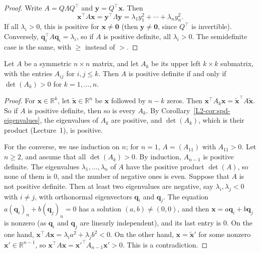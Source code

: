 \begin{proof}
    Write $A = Q\Lambda Q^\top$ and $\mathbf{y} = Q^\top \mathbf{x}$. Then
    \[\mathbf{x}^\top A \mathbf{x} = \mathbf{y}^\top \Lambda \mathbf{y} = \lambda_1 y_1^2 + \cdots + \lambda_n y_n^2.\]
    If all $\lambda_i > 0$, this is positive for $\mathbf{x} \neq \mathbf{0}$ (then $\mathbf{y} \neq \mathbf{0}$, since $Q^\top$ is invertible). Conversely, $\mathbf{q}_i^\top A \mathbf{q}_i = \lambda_i$, so if $A$ is positive definite, all $\lambda_i > 0$. The semidefinite case is the same, with $\geq$ instead of $>$.
\end{proof}

\begin{corollary}\label{L2-cor:sylvester}
    Let $A$ be a symmetric $n \times n$ matrix, and let $A_k$ be its upper left $k \times k$ submatrix, with the entries $A_{ij}$ for $i, j \leq k$. Then $A$ is positive definite if and only if $\det(A_k) > 0$ for $k = 1, \ldots, n$.
\end{corollary}

\begin{proof}
    For $\mathbf{x} \in \mathbb{R}^k$, let $\tilde{\mathbf{x}} \in \mathbb{R}^n$ be $\mathbf{x}$ followed by $n - k$ zeros. Then $\mathbf{x}^\top A_k \mathbf{x} = \tilde{\mathbf{x}}^\top A\tilde{\mathbf{x}}$. So if $A$ is positive definite, then so is every $A_k$. By Corollary~\ref{L2-cor:spd-eigenvalues}, the eigenvalues of $A_k$ are positive, and $\det(A_k)$, which is their product (Lecture~1), is positive.

    For the converse, we use induction on $n$; for $n = 1$, $A = (A_{11})$ with $A_{11} > 0$. Let $n \geq 2$, and assume that all $\det(A_k) > 0$. By induction, $A_{n-1}$ is positive definite. The eigenvalues $\lambda_1, \ldots, \lambda_n$ of $A$ have the positive product $\det(A)$, so none of them is $0$, and the number of negative ones is even. Suppose that $A$ is not positive definite. Then at least two eigenvalues are negative, say $\lambda_i, \lambda_j < 0$ with $i \neq j$, with orthonormal eigenvectors $\mathbf{q}_i$ and $\mathbf{q}_j$. The equation $a(\mathbf{q}_i)_n + b(\mathbf{q}_j)_n = 0$ has a solution $(a, b) \neq (0, 0)$, and then $\mathbf{x} = a\mathbf{q}_i + b\mathbf{q}_j$ is nonzero (as $\mathbf{q}_i$ and $\mathbf{q}_j$ are linearly independent), and its last entry is $0$. On the one hand, $\mathbf{x}^\top A\mathbf{x} = \lambda_i a^2 + \lambda_j b^2 < 0$. On the other hand, $\mathbf{x} = \tilde{\mathbf{x}}'$ for some nonzero $\mathbf{x}' \in \mathbb{R}^{n-1}$, so $\mathbf{x}^\top A\mathbf{x} = \mathbf{x}'^\top A_{n-1}\mathbf{x}' > 0$. This is a contradiction.
\end{proof}

